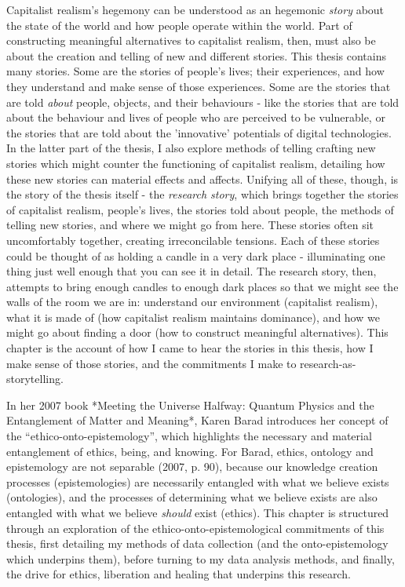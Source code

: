 Capitalist realism's hegemony can be understood as an hegemonic \textit{story} about the state of the world and how people operate within the world. Part of constructing meaningful alternatives to capitalist realism, then, must also be about the creation and telling of new and different stories. This thesis contains many stories. Some are the stories of people’s lives; their experiences, and how they understand and make sense of those experiences. Some are the stories that are told \textit{about} people, objects, and their behaviours - like the stories that are told about the behaviour and lives of people who are perceived to be vulnerable, or the stories that are told about the 'innovative' potentials of digital technologies. In the latter part of the thesis, I also explore methods of telling crafting new stories which might counter the functioning of capitalist realism, detailing how these new stories can material effects and affects. Unifying all of these, though, is the story of the thesis itself - the \textit{research story}, which brings together the stories of capitalist realism, people's lives, the stories told about people, the methods of telling new stories, and where we might go from here. These stories often sit uncomfortably together, creating irreconcilable tensions. Each of these stories could be thought of as holding a candle in a very dark place - illuminating one thing just well enough that you can see it in detail. The research story, then, attempts to bring enough candles to enough dark places so that we might see the walls of the room we are in: understand our environment (capitalist realism), what it is made of (how capitalist realism maintains dominance), and how we might go about finding a door (how to construct meaningful alternatives). This chapter is the account of how I came to hear the stories in this thesis, how I make sense of those stories, and the commitments I make to research-as-storytelling. 

In her 2007 book *Meeting the Universe Halfway: Quantum Physics and the Entanglement of Matter and Meaning*, Karen Barad introduces her concept of the “ethico-onto-epistemology”, which highlights the necessary and material entanglement of ethics, being, and knowing. For Barad, ethics, ontology and epistemology are not separable (2007, p. 90), because our knowledge creation processes (epistemologies) are necessarily entangled with what we believe exists (ontologies), and the processes of determining what we believe exists are also entangled with what we believe \textit{should} exist (ethics). This chapter is structured through an exploration of the ethico-onto-epistemological commitments of this thesis, first detailing my methods of data collection (and the onto-epistemology which underpins them), before turning to my data analysis methods, and finally, the drive for ethics, liberation and healing that underpins this research. 

